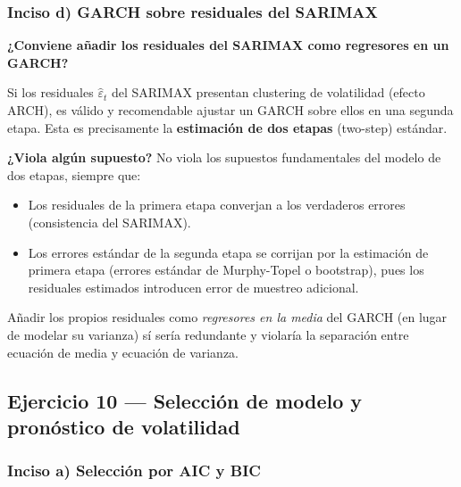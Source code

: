 \documentclass[12pt,a4paper]{article}
\begin{document}
\subsubsection*{Inciso d) GARCH sobre residuales del SARIMAX}

\begin{solucion}
\textbf{¿Conviene añadir los residuales del SARIMAX como regresores en un GARCH?}

Si los residuales $\hat{\varepsilon}_t$ del SARIMAX presentan clustering de volatilidad (efecto ARCH), es válido y recomendable ajustar un GARCH sobre ellos en una segunda etapa. Esta es precisamente la \textbf{estimación de dos etapas} (two-step) estándar.

\textbf{¿Viola algún supuesto?} No viola los supuestos fundamentales del modelo de dos etapas, siempre que:
\begin{itemize}[noitemsep]
  \item Los residuales de la primera etapa converjan a los verdaderos errores (consistencia del SARIMAX).
  \item Los errores estándar de la segunda etapa se corrijan por la estimación de primera etapa (errores estándar de Murphy-Topel o bootstrap), pues los residuales estimados introducen error de muestreo adicional.
\end{itemize}
Añadir los propios residuales como \emph{regresores en la media} del GARCH (en lugar de modelar su varianza) sí sería redundante y violaría la separación entre ecuación de media y ecuación de varianza.
\end{solucion}

\subsection{Ejercicio 10 — Selección de modelo y pronóstico de volatilidad}

\subsubsection*{Inciso a) Selección por AIC y BIC}
\end{document}
